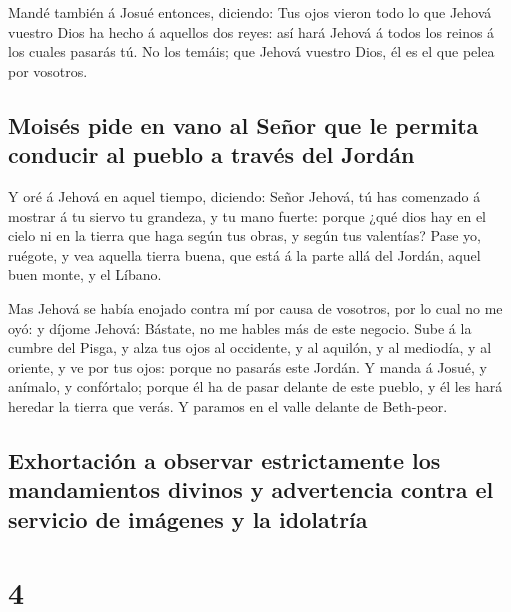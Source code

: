  Mandé también á Josué entonces, diciendo: Tus ojos
vieron todo lo que Jehová vuestro Dios ha hecho á aquellos dos reyes:
así hará Jehová á todos los reinos á los cuales pasarás tú.
 No los temáis; que Jehová vuestro Dios, él es el que
pelea por vosotros.

\hypertarget{moisuxe9s-pide-en-vano-al-seuxf1or-que-le-permita-conducir-al-pueblo-a-travuxe9s-del-jorduxe1n}{%
\subsection{Moisés pide en vano al Señor que le permita conducir al
pueblo a través del
Jordán}\label{moisuxe9s-pide-en-vano-al-seuxf1or-que-le-permita-conducir-al-pueblo-a-travuxe9s-del-jorduxe1n}}

 Y oré á Jehová en aquel tiempo, diciendo:
 Señor Jehová, tú has comenzado á mostrar á tu siervo tu
grandeza, y tu mano fuerte: porque ¿qué dios hay en el cielo ni en la
tierra que haga según tus obras, y según tus valentías? 
Pase yo, ruégote, y vea aquella tierra buena, que está á la parte allá
del Jordán, aquel buen monte, y el Líbano.

 Mas Jehová se había enojado contra mí por causa de
vosotros, por lo cual no me oyó: y díjome Jehová: Bástate, no me hables
más de este negocio.  Sube á la cumbre del Pisga, y alza
tus ojos al occidente, y al aquilón, y al mediodía, y al oriente, y ve
por tus ojos: porque no pasarás este Jordán.  Y manda á
Josué, y anímalo, y confórtalo; porque él ha de pasar delante de este
pueblo, y él les hará heredar la tierra que verás.  Y
paramos en el valle delante de Beth-peor.

\hypertarget{exhortaciuxf3n-a-observar-estrictamente-los-mandamientos-divinos-y-advertencia-contra-el-servicio-de-imuxe1genes-y-la-idolatruxeda}{%
\subsection{Exhortación a observar estrictamente los mandamientos
divinos y advertencia contra el servicio de imágenes y la
idolatría}\label{exhortaciuxf3n-a-observar-estrictamente-los-mandamientos-divinos-y-advertencia-contra-el-servicio-de-imuxe1genes-y-la-idolatruxeda}}

\hypertarget{section-05-4}{%
\section{4}\label{section-05-4}}

